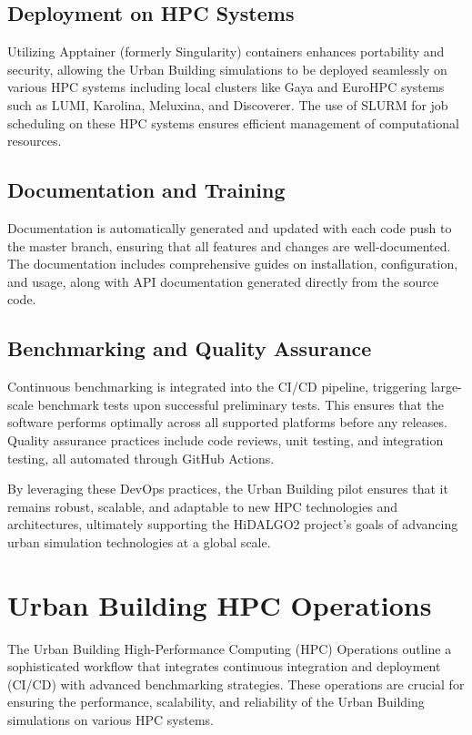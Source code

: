 \subsection{Deployment on HPC Systems}
Utilizing Apptainer (formerly Singularity) containers enhances portability and security, allowing the Urban Building simulations to be deployed seamlessly on various HPC systems including local clusters like Gaya and EuroHPC systems such as LUMI, Karolina, Meluxina, and Discoverer. The use of SLURM for job scheduling on these HPC systems ensures efficient management of computational resources.

\subsection{Documentation and Training}
Documentation is automatically generated and updated with each code push to the master branch, ensuring that all features and changes are well-documented. The documentation includes comprehensive guides on installation, configuration, and usage, along with API documentation generated directly from the source code.

\subsection{Benchmarking and Quality Assurance}
Continuous benchmarking is integrated into the CI/CD pipeline, triggering large-scale benchmark tests upon successful preliminary tests. This ensures that the software performs optimally across all supported platforms before any releases. Quality assurance practices include code reviews, unit testing, and integration testing, all automated through GitHub Actions.

By leveraging these DevOps practices, the Urban Building pilot ensures that it remains robust, scalable, and adaptable to new HPC technologies and architectures, ultimately supporting the HiDALGO2 project's goals of advancing urban simulation technologies at a global scale.


\section{Urban Building HPC Operations}

The Urban Building High-Performance Computing (HPC) Operations outline a sophisticated workflow that integrates continuous integration and deployment (CI/CD) with advanced benchmarking strategies. These operations are crucial for ensuring the performance, scalability, and reliability of the Urban Building simulations on various HPC systems.

